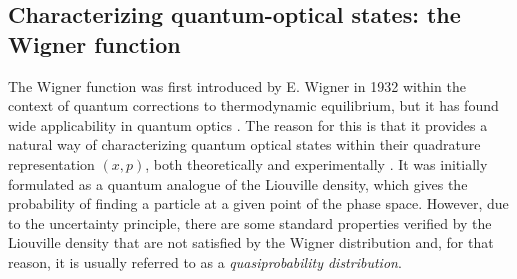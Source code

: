 \subsection{Characterizing quantum-optical states: the Wigner function}
The Wigner function was first introduced by E. Wigner in 1932 \cite{Wigner1932} within the context of quantum corrections to thermodynamic equilibrium, but it has found wide applicability in quantum optics \cite{SchleichBook, ScullyBook}. The reason for this is that it provides a natural way of characterizing quantum optical states within their quadrature representation $(x,p)$, both theoretically and experimentally \cite{Smithey1993}. It was initially formulated as a quantum analogue of the Liouville density, which gives the probability of finding a particle at a given point of the phase space. However, due to the uncertainty principle, there are some standard properties verified by the Liouville density that are not satisfied by the Wigner distribution and, for that reason, it is usually referred to as a \emph{quasiprobability distribution}.

